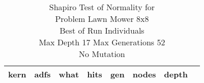 \begin{table}[H]
\caption{Shapiro Test of Normality for \\ Problem  Lawn Mower 8x8\\Best of Run Individuals \\ Max Depth 17 Max Generations 52\\ No Mutation \\}
\begin{center}
\scalebox{0.8} %
{
\begin{tabular}{lrrrrrrr}
\hline
kern & adfs & what & hits & gen & nodes & depth \\
\hline


\end{tabular}
}
\end{center}
\end{table}

